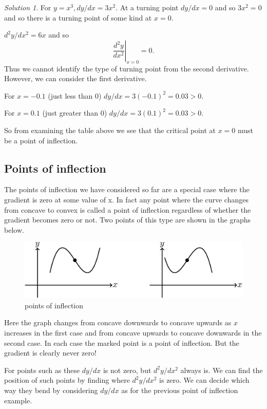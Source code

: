 \documentclass[
  11pt,
  oneside]{book}
\newcommand{\slide}{}
\theoremstyle{definition}
\theoremstyle{definition}
\theoremstyle{definition}
\theoremstyle{definition}
\theoremstyle{remark}
\newtheorem*{solution}{Solution}
\begin{document}
\begin{solution}
For \(y=x^3, dy/dx = 3x^2\). At a turning point \(dy/dx=0\) and so \(3x^2=0\) and so there is a turning point of some kind at \(x=0\).

\(d^2y/dx^2=6x\) and so
\[
\left.\frac{d^2y}{dx^2}\right\vert_{x=0} = 0.
\]
Thus we cannot identify the type of turning point from the second derivative.
However, we can consider the first derivative.

For \(x=-0.1\) (just less than \(0\)) \(dy/dx = 3(-0.1)^2 = 0.03>0\).

For \(x = 0.1\) (just greater than \(0\)) \(dy/dx=3(0.1)^2 = 0.03>0\).

So from examining the table above we see that the critical point at \(x=0\) must be a point of inflection.
\end{solution}

\slide

\subsection{Points of inflection}\label{points-of-inflection-1}

The points of inflection we have considered so far are a special case where the gradient is zero at
some value of x. In fact any point where the curve changes from concave to convex is called a
point of inflection regardless of whether the gradient becomes zero or not. Two points of this type
are shown in the graphs below.

\begin{figure}

{\centering \includegraphics[width=0.6\linewidth]{tikztopng-figure10} 

}

\caption{points of inflection}\label{fig:unnamed-chunk-21}
\end{figure}

Here the graph changes from concave downwards to concave upwards as \(x\) increases in the first case and from concave upwards to concave downwards in the second case. In each case the marked point is a point of inflection. But the gradient is clearly never zero!

For points such as these \(dy/dx\) is not zero, but \(d^2y/dx^2\) always is. We can find the position of such points by finding where \(d^2y/dx^2\) is zero. We can decide which way they bend by considering \(dy/dx\) as for the previous point of inflection example.
\slide
\end{document}
